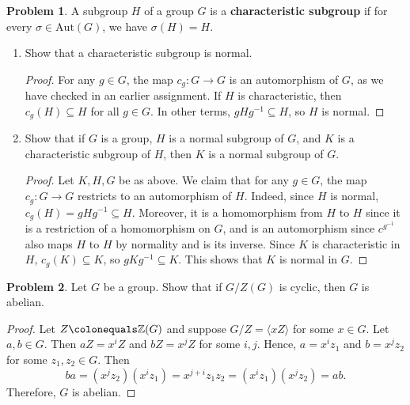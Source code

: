 \documentclass[11pt]{article}
\newcommand{\Z}{\mathbb{Z}}
\theoremstyle{definition}
\newtheorem{problem}{Problem}
\begin{document}
      
\smallskip


\begin{problem} A subgroup $H$ of a group $G$ is a \textbf{characteristic subgroup} if for every $\sigma\in \mathrm{Aut}(G)$, we have $\sigma(H) = H$.
\begin{enumerate}[(3.1)]
\item Show that a characteristic subgroup is normal.

\begin{proof}
For any $g\in G$, the map $c_g: G\to G$ is an automorphism of $G$, as we have checked in an earlier assignment. If $H$ is characteristic, then $c_g(H)\subseteq H$ for all $g\in G$. In other terms, $gHg^{-1} \subseteq H$, so $H$ is normal.
\end{proof}

\item Show that if $G$ is a group, $H$ is a normal subgroup of $G$, and $K$ is a characteristic subgroup of $H$, then $K$ is a normal subgroup of $G$.
\begin{proof} Let $K,H,G$ be as above. We claim that for any $g\in G$, the map $c_g: G\to G$ restricts to an automorphism of $H$. Indeed, since $H$ is normal, $c_g(H) = gHg^{-1} \subseteq H$. Moreover, it is a homomorphism from $H$ to $H$ since it is a restriction of a homomorphism on $G$, and is an automorphism since $c^{g^{-1}}$ also maps $H$ to $H$ by normality and is its inverse. Since $K$ is characteristic in $H$, $c_g(K)\subseteq K$, so $gKg^{-1} \subseteq K$. This shows that $K$ is normal in $G$.
\end{proof}
\end{enumerate}
\end{problem}


\smallskip

\newpage
\begin{problem} Let $G$ be a group. Show that if $G/Z(G)$ is cyclic, then $G$ is abelian.
\end{problem} 

\begin{proof}
Let $Z \colonequals \Z(G)$ and suppose $G/Z=\langle xZ \rangle$ for some $x\in G$.  Let $a,b\in G$.  Then $aZ=x^iZ$ and $bZ=x^jZ$ for some $i,j$.  Hence, $a=x^iz_1$ and $b=x^jz_2$ for some $z_1,z_2\in G$.  Then 
$$ba=(x^jz_2)(x^iz_1)=x^{j+i}z_1z_2=(x^iz_1)(x^jz_2)=ab.$$  
Therefore, $G$ is abelian.	
\end{proof}

\smallskip
\end{document}
